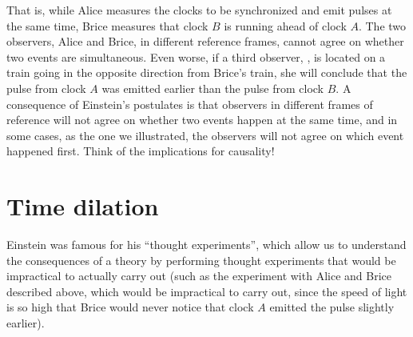 That is, while Alice measures the clocks to be synchronized and emit pulses at the same time, Brice measures that clock $B$ is running ahead of clock $A$. The two observers, Alice and Brice, in different reference frames, cannot agree on whether two events are simultaneous. Even worse, if a third observer, \chloens, is located on a train going in the opposite direction from Brice's train, she will conclude that the pulse from clock $A$ was emitted earlier than the pulse from clock $B$. A consequence of Einstein's postulates is that observers in different frames of reference will not agree on whether two events happen at the same time, and in some cases, as the one we illustrated, the observers will not agree on which event happened first. Think of the implications for causality!

\section{Time dilation}
Einstein was famous for his ``thought experiments'', which allow us to understand the consequences of a theory by performing thought experiments that would be impractical to actually carry out (such as the experiment with Alice and Brice described above, which would be impractical to carry out, since the speed of light is so high that Brice would never notice that clock $A$ emitted the pulse slightly earlier). 

